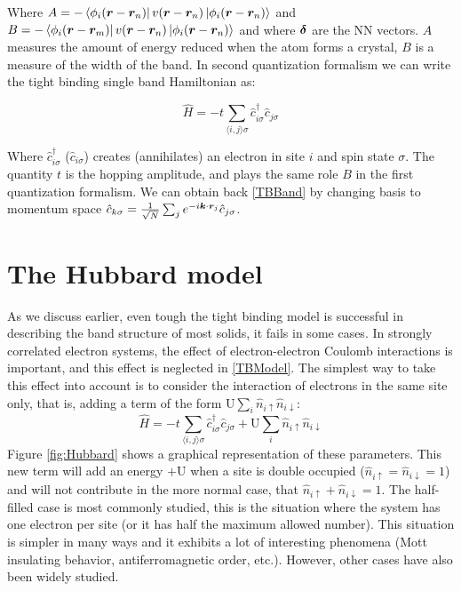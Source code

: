 Where $A = -\bra{\phi_i(\boldsymbol{r}-\boldsymbol{r}_n)}v(\boldsymbol{r}-\boldsymbol{r}_n) \ket{\phi_i(\boldsymbol{r}-\boldsymbol{r}_n)}$ and $B = -\bra{\phi_i(\boldsymbol{r}-\boldsymbol{r}_m)}v(\boldsymbol{r}-\boldsymbol{r}_n) \ket{\phi_i(\boldsymbol{r}-\boldsymbol{r}_n)}$ and where $\boldsymbol{\delta}$ are the NN vectors. $A$ measures the amount of energy reduced when the atom forms a crystal, $B$ is a measure of the width of the band.
In second quantization formalism we can write the tight binding single band Hamiltonian as:

\begin{equation}
\label{TBModel}
\hat{H} = -t\sum_{\langle i,j \rangle \sigma} \hat{c}^{\dagger}_{i\sigma}\hat{c}_{j\sigma}
\end{equation}

Where $\hat{c}^{\dagger}_{i\sigma}$ ($\hat{c}_{i\sigma}$) creates (annihilates) an electron in site $i$ and spin state $\sigma$. The quantity $t$ is the hopping amplitude, and plays the same role $B$ in the first quantization formalism. We can obtain back \ref{TBBand} by changing basis to momentum space $\hat{c}_{k\sigma} = \frac{1}{\sqrt{N}}\sum_j e^{-i\boldsymbol{k}\cdot\boldsymbol{r}_j}\hat{c}_{j\sigma}$.

\section{The Hubbard model}

As we discuss earlier, even tough the tight binding model is successful in describing the band structure of most solids, it fails in some cases. In strongly correlated electron systems, the effect of electron-electron Coulomb interactions is important, and this effect is neglected in \ref{TBModel}. The simplest way to take this effect into account is to consider the interaction of electrons in the same site only, that is, adding a term of the form $\text{U}\sum_i \hat{n}_{i\uparrow}\hat{n}_{i\downarrow}$:
\begin{equation}
\label{HH}
\hat{H} = -t\sum_{\langle i,j \rangle \sigma} \hat{c}^{\dagger}_{i\sigma}\hat{c}_{j\sigma} + \text{U}\sum_i \hat{n}_{i\uparrow}\hat{n}_{i\downarrow}
\end{equation}
Figure \ref{fig:Hubbard} shows a graphical representation of these parameters. This new term will add an energy $+\text{U}$ when a site is double occupied ($\hat{n}_{i\uparrow} = \hat{n}_{i\downarrow} = 1$) and will not contribute in the more normal case, that $\hat{n}_{i\uparrow} + \hat{n}_{i\downarrow} = 1$. The half-filled case is most commonly studied, this is the situation where the system has one electron per site (or it has half the maximum allowed number). This situation is simpler in many ways and it exhibits a lot of interesting phenomena (Mott insulating behavior, antiferromagnetic order, etc.). However, other cases have also been widely studied.


